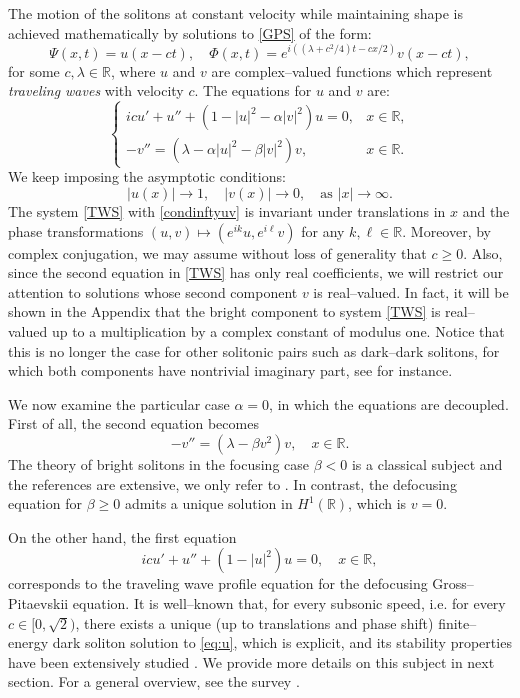 \documentclass[11pt]{article}
\newcommand{\R}{\mathbb{R}}
\theoremstyle{plain}
\theoremstyle{definition}
\theoremstyle{remark}
\numberwithin{equation}{section}
\begin{document}
{The motion of the solitons at constant velocity while maintaining shape is achieved mathematically by solutions to \eqref{GPS} of the form:
\[
\Psi(x,t) = u(x-ct),\quad \Phi(x,t) = e^{i((\lambda+c^2/4)t-cx/2)}v(x-ct),
\]
for some $c,\lambda\in\mathbb{R}$, where $u$ and $v$ are complex--valued functions which represent \emph{traveling waves} with velocity $c$. The equations for $u$ and $v$ are:
\begin{equation}\label{TWS}
\begin{cases}
icu' + u'' + (1-|u|^2-\alpha|v|^2)u=0, &x\in\mathbb{R},
\\
-v''=(\lambda -\alpha|u|^2-\beta|v|^2)v, &x\in\mathbb{R}.
\end{cases}
\end{equation}
We keep imposing the asymptotic conditions:
\begin{equation}\label{condinftyuv}
|u(x)|\to 1,\quad |v(x)|\to 0,\quad\text{as }|x|\to\infty.
\end{equation}
The system \eqref{TWS} with \eqref{condinftyuv} is invariant under translations in $x$ and the phase transformations $(u,v)\mapsto (e^{ik}u, e^{i\ell}v)$ for any $k,\ell\in\mathbb{R}$. Moreover, by complex conjugation, we may assume without loss of generality that $c \geq 0$. Also, since the second equation in \eqref{TWS} has
only real coefficients, we will restrict our attention to solutions whose second component $v$
is real--valued. In fact, it will be shown in the Appendix that the bright component to  system \eqref{TWS} is real--valued up to a multiplication by a complex constant of modulus one. Notice that this is no longer the case for other solitonic pairs such as dark--dark solitons, for which both components have nontrivial imaginary part, see \cite{Sheppard_Kivshar} for instance.

We now examine the particular case $\alpha=0$, in which the equations are decoupled. First of all, the second equation becomes
\begin{equation}\label{eq:v}
-v'' = (\lambda - \beta v^2)v,\quad x\in\mathbb{R}.
\end{equation}
The theory of bright solitons in the focusing case $\beta<0$ is a classical subject and the references are extensive, we only refer to \cite{cazenave}. In contrast,  the defocusing equation for $\beta\geq 0$ admits a unique solution in $H^1(\R)$, which is $v = 0$. 

On the other hand, the first equation
\begin{equation}\label{eq:u}
icu' + u'' + (1-|u|^2)u=0,\quad x\in\mathbb{R},
\end{equation}
corresponds to the traveling wave profile equation for the defocusing Gross--Pitaevskii equation. It is well--known that, for every subsonic speed, i.e. for every $c\in [0,\sqrt{2})$, there exists a unique (up to translations and phase shift) finite--energy dark soliton solution to \eqref{eq:u}, which is explicit, and its stability properties have been extensively studied \cite{linbubbles,DiMenzaGallo,orbitalblack,asymptoticgray,asymptstabblack}. We provide more details on this subject in next section. For a general overview, see the survey \cite{bethuel0}.

}
\end{document}
